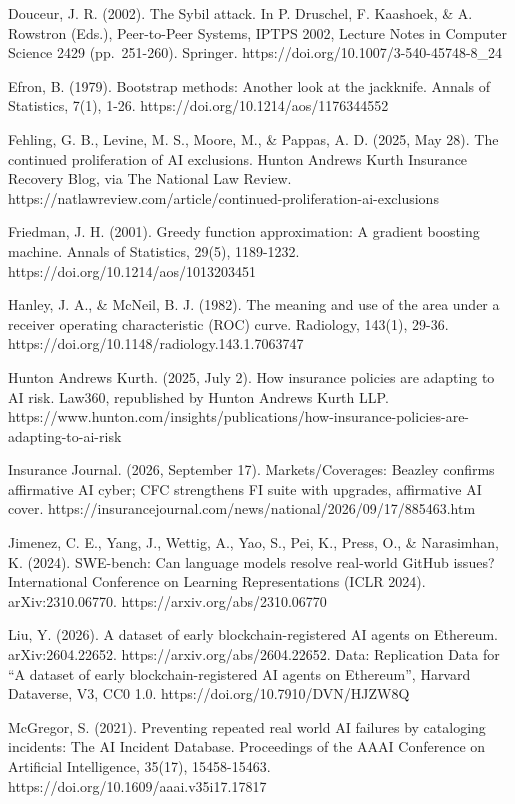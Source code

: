 \documentclass[
  11pt,
  a4paper,
]{article}
\begin{document}
Douceur, J. R. (2002). The Sybil attack. In P. Druschel, F. Kaashoek, \&
A. Rowstron (Eds.), Peer-to-Peer Systems, IPTPS 2002, Lecture Notes in
Computer Science 2429 (pp.~251-260). Springer.
https://doi.org/10.1007/3-540-45748-8\_24

Efron, B. (1979). Bootstrap methods: Another look at the jackknife.
Annals of Statistics, 7(1), 1-26. https://doi.org/10.1214/aos/1176344552

Fehling, G. B., Levine, M. S., Moore, M., \& Pappas, A. D. (2025, May
28). The continued proliferation of AI exclusions. Hunton Andrews Kurth
Insurance Recovery Blog, via The National Law Review.
https://natlawreview.com/article/continued-proliferation-ai-exclusions

Friedman, J. H. (2001). Greedy function approximation: A gradient
boosting machine. Annals of Statistics, 29(5), 1189-1232.
https://doi.org/10.1214/aos/1013203451

Hanley, J. A., \& McNeil, B. J. (1982). The meaning and use of the area
under a receiver operating characteristic (ROC) curve. Radiology,
143(1), 29-36. https://doi.org/10.1148/radiology.143.1.7063747

Hunton Andrews Kurth. (2025, July 2). How insurance policies are
adapting to AI risk. Law360, republished by Hunton Andrews Kurth LLP.
https://www.hunton.com/insights/publications/how-insurance-policies-are-adapting-to-ai-risk

Insurance Journal. (2026, September 17). Markets/Coverages: Beazley
confirms affirmative AI cyber; CFC strengthens FI suite with upgrades,
affirmative AI cover.
https://insurancejournal.com/news/national/2026/09/17/885463.htm

Jimenez, C. E., Yang, J., Wettig, A., Yao, S., Pei, K., Press, O., \&
Narasimhan, K. (2024). SWE-bench: Can language models resolve real-world
GitHub issues? International Conference on Learning Representations
(ICLR 2024). arXiv:2310.06770. https://arxiv.org/abs/2310.06770

Liu, Y. (2026). A dataset of early blockchain-registered AI agents on
Ethereum. arXiv:2604.22652. https://arxiv.org/abs/2604.22652. Data:
Replication Data for ``A dataset of early blockchain-registered AI
agents on Ethereum'', Harvard Dataverse, V3, CC0 1.0.
https://doi.org/10.7910/DVN/HJZW8Q

McGregor, S. (2021). Preventing repeated real world AI failures by
cataloging incidents: The AI Incident Database. Proceedings of the AAAI
Conference on Artificial Intelligence, 35(17), 15458-15463.
https://doi.org/10.1609/aaai.v35i17.17817
\end{document}
